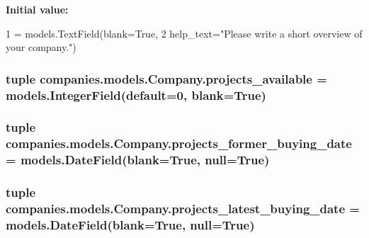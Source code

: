 {\bfseries Initial value\-:}
\begin{DoxyCode}
1 = models.TextField(blank=\textcolor{keyword}{True},
2                                 help\_text=\textcolor{stringliteral}{"Please write a short overview of your company."})
\end{DoxyCode}
\hypertarget{classcompanies_1_1models_1_1_company_a4f434779b857f4d1cd0e9b9f67d950be}{
\subsubsection[{projects\-\_\-available}]{\setlength{\rightskip}{0pt plus 5cm}tuple companies.\-models.\-Company.\-projects\-\_\-available = models.\-Integer\-Field(default=0, blank=True)\hspace{0.3cm}{\ttfamily [static]}}}\label{classcompanies_1_1models_1_1_company_a4f434779b857f4d1cd0e9b9f67d950be}
\hypertarget{classcompanies_1_1models_1_1_company_a9b047e236e4419f31a944f8dee44948b}{
\subsubsection[{projects\-\_\-former\-\_\-buying\-\_\-date}]{\setlength{\rightskip}{0pt plus 5cm}tuple companies.\-models.\-Company.\-projects\-\_\-former\-\_\-buying\-\_\-date = models.\-Date\-Field(blank=True, null=True)\hspace{0.3cm}{\ttfamily [static]}}}\label{classcompanies_1_1models_1_1_company_a9b047e236e4419f31a944f8dee44948b}
\hypertarget{classcompanies_1_1models_1_1_company_a8c9f48d88310960c158105bce0667e05}{
\subsubsection[{projects\-\_\-latest\-\_\-buying\-\_\-date}]{\setlength{\rightskip}{0pt plus 5cm}tuple companies.\-models.\-Company.\-projects\-\_\-latest\-\_\-buying\-\_\-date = models.\-Date\-Field(blank=True, null=True)\hspace{0.3cm}{\ttfamily [static]}}}\label{classcompanies_1_1models_1_1_company_a8c9f48d88310960c158105bce0667e05}
